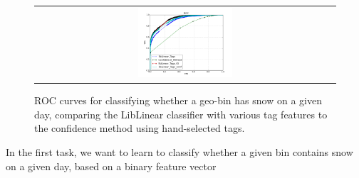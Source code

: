 %
\begin{figure}
\begin{center}
\vspace{-12pt}
\begin{tabular}{c}
\includegraphics[width=0.32\textwidth]{plots/LibLinear_new_Bins4years2year2years_ROC_conf_IG_Tags_2.png} \\ 
\end{tabular}
\end{center}
\vspace{-12pt}
\caption{ROC curves for classifying whether a geo-bin has snow on a given day, comparing the LibLinear classifier with various tag features to the confidence method using hand-selected tags.}
\label{fig:dmnb-classifier}
\end{figure}
%
In the first task, we want to learn to classify whether a given bin
contains snow on a given day, based on a binary feature vector
